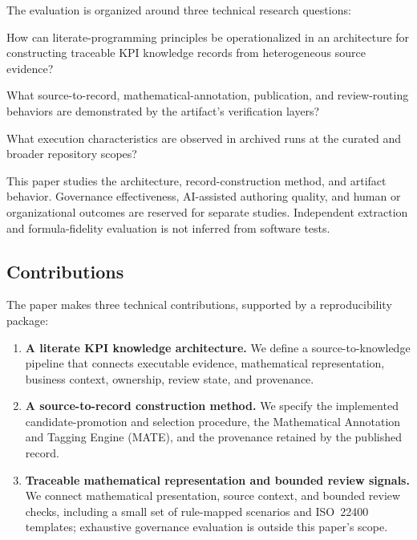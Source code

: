\documentclass[a4paper,fleqn]{cas-dc}
\begin{document}
The evaluation is organized around three technical research questions:

\begin{description}[style=nextline,leftmargin=1.2cm]
  \item[\textbf{RQ1}] How can literate-programming principles be operationalized in an architecture for constructing traceable KPI knowledge records from heterogeneous source evidence?
  \item[\textbf{RQ2}] What source-to-record, mathematical-annotation, publication, and review-routing behaviors are demonstrated by the artifact's verification layers?
  \item[\textbf{RQ3}] What execution characteristics are observed in archived runs at the curated and broader repository scopes?

\end{description}

This paper studies the architecture, record-construction method, and artifact behavior. Governance effectiveness, AI-assisted authoring quality, and human or organizational outcomes are reserved for separate studies. Independent extraction and formula-fidelity evaluation is not inferred from software tests.

\subsection{Contributions}

The paper makes three technical contributions, supported by a reproducibility package:

\begin{enumerate}[leftmargin=*]
  \item \textbf{A literate KPI knowledge architecture.} We define a source-to-knowledge pipeline that connects executable evidence, mathematical representation, business context, ownership, review state, and provenance.
  \item \textbf{A source-to-record construction method.} We specify the implemented candidate-promotion and selection procedure, the Mathematical Annotation and Tagging Engine (MATE), and the provenance retained by the published record.
  \item \textbf{Traceable mathematical representation and bounded review signals.} We connect mathematical presentation, source context, and bounded review checks, including a small set of rule-mapped scenarios and ISO~22400 templates; exhaustive governance evaluation is outside this paper's scope.
\end{enumerate}
\end{document}
